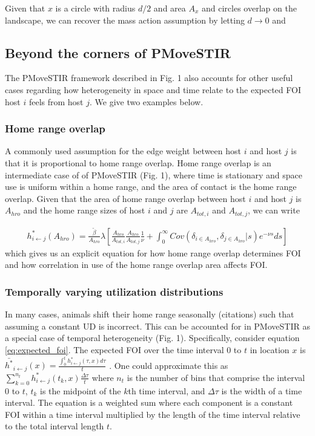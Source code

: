 \documentclass[letterpaper]{article}
\begin{document}
Given that $x$ is a circle with radius $d / 2$ and area $A_x$ and circles overlap on the landscape, we can recover the mass action assumption by letting $d \rightarrow 0$ and 

\subsection*{Beyond the corners of PMoveSTIR}

The PMoveSTIR framework described in Fig. 1 also accounts for other useful cases regarding how heterogeneity in space and time relate to the expected FOI host $i$ feels from host $j$.  We give two examples below.

\subsubsection*{Home range overlap}

A commonly used assumption for the edge weight between host $i$ and host $j$ is that it is proportional to home range overlap.  Home range overlap is an intermediate case of of PMoveSTIR (Fig. 1), where time is stationary and space use is uniform within a home range, and the area of contact is the home range overlap.  Given that the area of home range overlap between host $i$ and host $j$ is $A_{hro}$ and the home range sizes of host $i$ and $j$ are $A_{tot, i}$ and $A_{tot, j}$, we can write

\begin{equation}
    \begin{aligned}
    h^*_{i \leftarrow j}(A_{hro}) = \frac{\tilde{\beta}}{A_{hro}} \lambda \left[\frac{A_{hro}}{A_{tot, i}} \frac{A_{hro}}{A_{tot, j}}  \frac{1}{\nu} + \int_{0}^{\infty} Cov(\delta_{i \in A_{hro}}, \delta_{j \in A_{hro}} | s) e^{-\nu s} ds\right]
    \end{aligned}
    \label{eq:home_range}
\end{equation}
which gives us an explicit equation for how home range overlap determines FOI and how correlation in use of the home range overlap area affects FOI. 

\subsubsection*{Temporally varying utilization distributions}

In many cases, animals shift their home range seasonally (citations) such that assuming a constant UD is incorrect. This can be accounted for in PMoveSTIR as a special case of temporal heterogeneity (Fig. 1).  Specifically, consider equation \ref{eq:expected_foi}. The expected FOI over the time interval 0 to $t$ in location $x$ is $\bar{h^*}_{i \leftarrow j}(x) = \frac{\int_0^t h^*_{i \leftarrow j}(\tau, x) d\tau}{t}$ \citep{Wilber2022}.  One could approximate this as $\sum_{k = 0}^{n_t} h^*_{i \leftarrow j}(t_k, x) \frac{\Delta \tau}{t}$ where $n_t$ is the number of bins that comprise the interval 0 to $t$, $t_k$ is the midpoint of the $k$th time interval, and $\Delta \tau$ is the width of a time interval.  The equation is a weighted sum where each component is a constant FOI within a time interval multiplied by the length of the time interval relative to the total interval length $t$.  
\end{document}

